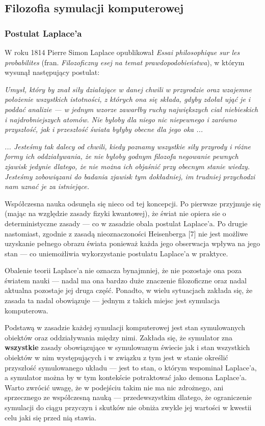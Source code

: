 \subsection{Filozofia symulacji komputerowej}

\subsubsection{Postulat Laplace'a}
\par{
W roku 1814 Pierre Simon Laplace opublikował \textit{Essai philosophique sur les probabilites} (fran. \textit{Filozoficzny esej na temat prawdopodobieństwa}), w którym wysunął następujący postulat:
}
\par{
\textit{Umysł, który by znał siły działające w danej chwili w przyrodzie oraz wzajemne położenie wszystkich istotności, z których ona się składa, gdyby zdołał ująć je i poddać analizie --- w jednym wzorze zawarłby ruchy największych ciał niebieskich i najdrobniejszych atomów. Nie byłoby dla niego nic niepewnego i zarówno przyszłość, jak i przeszłość świata byłyby obecne dla jego oka ...
}}
\par{
\textit{... Jesteśmy tak dalecy od chwili, kiedy poznamy wszystkie siły przyrody i różne formy ich oddziaływania, że nie byłoby godnym filozofa negowanie pewnych zjawisk jedynie dlatego, że nie można ich objaśnić przy obecnym stanie wiedzy. Jesteśmy zobowiązani do badania zjawisk tym dokładniej, im trudniej przychodzi nam uznać je za istniejące.}
}

\par{
Współczesna nauka odsunęła się nieco od tej koncepcji. Po pierwsze przyjmuje się (mając na względzie zasady fizyki kwantowej), że świat nie opiera sie o deterministyczne zasady --- co w zasadzie obala postulat Laplace'a. Po drugie nastomiast, zgodnie z zasadą nieoznaczoności Heisenberga [7] nie jest możliwe uzyskanie pełnego obrazu świata ponieważ każda jego obserwacja wpływa na jego stan --- co uniemożliwia wykorzystanie postulatu Laplace'a w praktyce.
}
\par{
Obalenie teorii Laplace'a nie oznacza bynajmniej, że nie pozostaje ona poza światem nauki --- nadal ma ona bardzo duże znaczenie filozoficzne oraz nadal aktualna pozostaje jej druga część. Ponadto, w wielu sytuacjach zakłada się, że zasada ta nadal obowiązuje --- jednym z takich miejsc jest symulacja komputerowa.
}
\par{
Podstawą w zasadzie każdej symulacji komputerowej jest stan symulowanych obiektów oraz oddziaływania między nimi. Zakłada się, że symulator zna \textbf{wszystkie} zasady obowiązujące w symulowanym świecie jak i stan wszystkich obiektów w nim występujących i w związku z tym jest w stanie określić przyszłość symulowanego układu --- jest to stan, o którym wspominał Laplace'a, a symulator można by w tym kontekście potraktować jako demona Laplace'a. Warto zwrócić uwagę, że w podejściu takim nie ma nic zdrożnego, ani sprzecznego ze współczesną nauką --- przedewszystkim dlatego, że ograniczenie symulacji do ciągu przyczyn i skutków nie obniża zwykle jej wartości w kwestii celu jaki się przed nią stawia.
}

